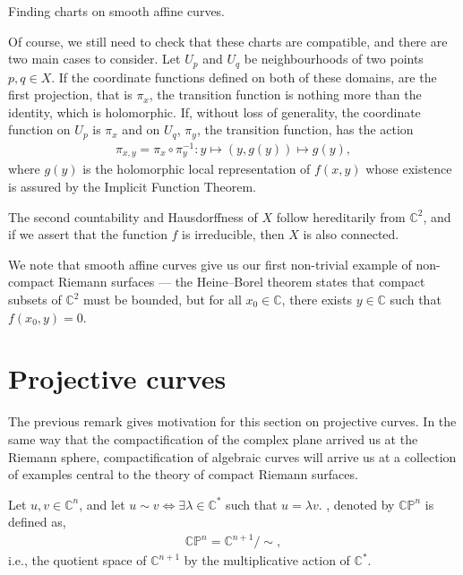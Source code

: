 \begin{marginfigure}
	\centering
	\caption{Finding charts on smooth affine curves.}
\end{marginfigure}


Of course, we still need to check that these charts are compatible, and there
are two main cases to consider. Let $ U_p $ and $ U_q $ be neighbourhoods of two
points $ p,q \in X $. If the coordinate functions defined on both of these domains, are the
first projection, that is $ \pi_x $, the transition function is nothing more
than the identity, which is holomorphic. If, without loss of generality, the
coordinate function on $ U_p $ is $ \pi_x $ and on $ U_q $, $ \pi_y $, the
transition function, has the action
\begin{align*}
	\pi _{x,y} = \pi_x \circ \pi_y ^{-1}: y \mapsto (y,g(y)) \mapsto g(y),
\end{align*}
where $ g(y) $ is the holomorphic local representation of $ f(x,y) $ whose
existence is assured by the Implicit Function Theorem.

The second countability and Hausdorffness of $ X $ follow hereditarily from $
	\mathbb{C}^{2} $, and if we assert that the function $ f $ is irreducible,
then $ X $ is also connected.

\begin{remark}
	We note that smooth affine curves give us our first non-trivial example of
	non-compact Riemann surfaces --- the Heine--Borel theorem states that compact
	subsets of $ \mathbb{C}^{2} $ must be bounded, but for all $ x_{0}\in
		\mathbb{C} $, there exists $ y \in \mathbb{C} $ such that $ f ( x_{0},y )=0
	$.
\end{remark}

\section{Projective curves}\label{sec:projective-curves}
The previous remark gives motivation for this section on projective curves. In
the same way that the compactification of the complex plane arrived us at the
Riemann sphere, compactification of algebraic curves will arrive us at a
collection of examples central to the theory of compact Riemann surfaces.

\begin{definition}
	Let $ u,v \in \mathbb{C}^{n} $, and let $ u \sim v \iff \exists \lambda \in
		\mathbb{C}^{*} $ such that $ u= \lambda v $. , denoted by $ \mathbb{C}\mathbb{P}^{n} $ is defined as,
	\begin{align*}
		\mathbb{C}\mathbb{P}^{n} = \mathbb{C} ^{n+1}/{\sim},
	\end{align*}
	i.e., the quotient space of $ \mathbb{C}^{n+1} $ by the multiplicative action
	of $ \mathbb{C}^{*} $.
\end{definition}


